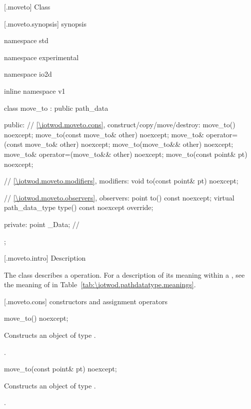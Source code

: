  [\iotwod.moveto] {Class }

 [\iotwod.moveto.synopsis] { synopsis}

\begin{codeblock}
namespace std { namespace experimental { namespace io2d { inline namespace v1 {
  class move_to : public path_data {
  public:
    // \ref{\iotwod.moveto.cons}, construct/copy/move/destroy:
    move_to() noexcept;
    move_to(const move_to& other) noexcept;
    move_to& operator=(const move_to& other) noexcept;
    move_to(move_to&& other) noexcept;
    move_to& operator=(move_to&& other) noexcept;
    move_to(const point& pt) noexcept;

    // \ref{\iotwod.moveto.modifiers}, modifiers:
    void to(const point& pt) noexcept;

    // \ref{\iotwod.moveto.observers}, observers:
    point to() const noexcept;
    virtual path_data_type type() const noexcept override;
    
  private:
    point _Data; // \expos
  };
} } } }
\end{codeblock}

 [\iotwod.moveto.intro] { Description}

\pnum
{}
The class  describes a  operation. For a description of its meaning within a , see the meaning of  in Table~\ref{tab:\iotwod.pathdatatype.meanings}.

 [\iotwod.moveto.cons] { constructors and assignment operators}

\begin{itemdecl}
    move_to() noexcept;
\end{itemdecl}
\begin{itemdescr}
	\pnum
	\effects
	Constructs an object of type .
	
	\pnum
	\postconditions
	.
\end{itemdescr}

\begin{itemdecl}
    move_to(const point& pt) noexcept;
\end{itemdecl}
\begin{itemdescr}
	\pnum
	\effects
	Constructs an object of type .
	
	\pnum
	\postconditions
	.
\end{itemdescr}

